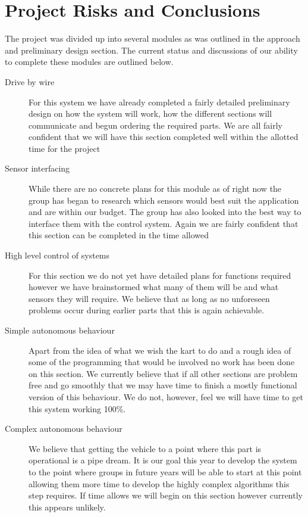 \chapter{Project Risks and Conclusions}

The project was divided up into several modules as was outlined in the approach and preliminary design section. The current status and discussions of our ability to complete these modules are outlined below.

\begin{description}
\item[Drive by wire] For this system we have already completed a fairly detailed preliminary design on how the system will work, how the different sections will communicate and begun ordering the required parts. We are all fairly confident that we will have this section completed well within the allotted time for the project

\item[Sensor interfacing] While there are no concrete plans for this module as of right now the group has began to research which sensors would best suit the application and are within our budget. The group has also looked into the best way to interface them with the control system. Again we are fairly confident that this section can be completed in the time allowed

\item[High level control of systems] For this section we do not yet have detailed plans for functions required however we have brainstormed what many of them will be and what sensors they will require. We believe that as long as no unforeseen problems occur during earlier parts that this is again achievable.

\item[Simple autonomous behaviour] Apart from the idea of what we wish the kart to do and a rough idea of some of the programming that would be involved no work has been done on this section. We currently believe that if all other sections are problem free and go smoothly that we may have time to finish a mostly functional version of this behaviour. We do not, however, feel we will have time to get this system working 100\%.

\item[Complex autonomous behaviour] We believe that getting the vehicle to a point where this part is operational is a pipe dream. It is our goal this year to develop the system to the point where groups in future years will be able to start at this point allowing them more time to develop the highly complex algorithms this step requires. If time allows we will begin on this section however currently this appears unlikely.
\end{description}